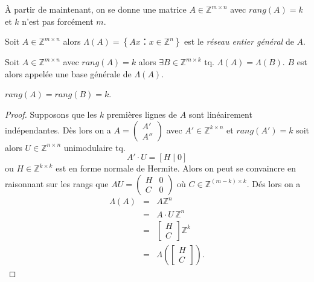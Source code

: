 À partir de maintenant, on se donne une matrice $A\in \mathbb{Z}^{m\times n}$ avec $rang(A)=k$ et $k$ n'est pas forcément $m$.

\begin{definition} \label{def:63}
  Soit  $A\in \mathbb{Z}^{m\times n}$ alors $\Lambda(A)=\left\{ Ax ：x\in \mathbb{Z
    }^{n} \right\} $ est le \emph{réseau entier général} de $A$.
\end{definition}



\begin{theorem}
    \label{thr:28}
    Soit  $A\in \mathbb{Z}^{m\times n}$ avec $rang(A)=k$ alors $\exists B \in \mathbb{Z}^{m \times k}$ tq. $\Lambda(A)=\Lambda(B)$. $B$ est alors appelée une base générale de $\Lambda(A)$.
    \end{theorem}
    
    \begin{remark}
      $rang(A)=rang(B)=k$.
    \end{remark}
    
    \begin{proof}
      Supposons que les $k$ premières lignes de $A$ sont linéairement
      indépendantes.  Dès lors on a
      $A=\begin{pmatrix} A' \\ A'' \end{pmatrix}$ avec
      $A'\in \mathbb{Z}^{k \times n}$ et $rang(A')=k$ soit alors
      $U\in \mathbb{Z}^{n \times n}$ unimodulaire tq.
      \begin{displaymath}
        A' ⋅ U = [H \mid 0]
      \end{displaymath}
      ou
      $H \in \mathbb{Z}^{k \times k}$ est en forme normale de
      Hermite. Alors on peut se convaincre en raisonnant sur les rangs
      que $AU=\begin{pmatrix} H & 0 \\ C & 0 \end{pmatrix}$ où $C ∈ ℤ^{(m-k)×k}$. Dés lors
      on a
      \begin{eqnarray*}
        \Lambda(A) & = & A\mathbb{Z}^n \\
                   & = & A⋅U \, \mathbb{Z}^n \\
        & = & \left[\begin{matrix} H   \\
          C \end{matrix} \right]\mathbb{Z}^k \\
        & = & \Lambda\left(  \left[\begin{matrix} H   \\
          C \end{matrix} \right]  \right).
      \end{eqnarray*}      
    \end{proof}
    
